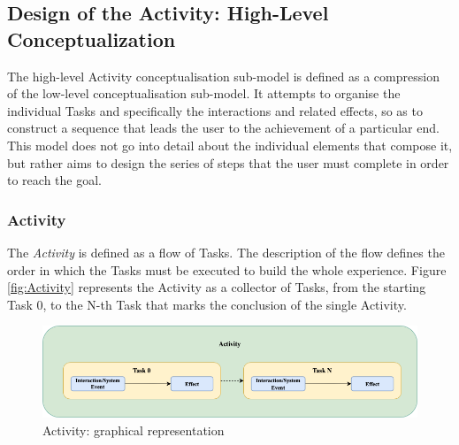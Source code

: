 \subsection*{Design of the Activity: High-Level Conceptualization}
The high-level Activity conceptualisation sub-model is defined as a compression of the low-level conceptualisation sub-model. It attempts to organise the individual Tasks and specifically the interactions and related effects, so as to construct a sequence that leads the user to the achievement of a particular end. This model does not go into detail about the individual elements that compose it, but rather aims to design the series of steps that the user must complete in order to reach the goal. 

\subsubsection*{Activity}
The \emph{Activity} is defined as a flow of Tasks. The description of the flow defines the order in which the Tasks must be executed to build the whole experience. Figure \autoref{fig:Activity} represents the Activity as a collector of Tasks, from the starting Task 0, to the N-th Task that marks the conclusion of the single Activity. 
\begin{figure}[h]
	\centering
	\includegraphics[width=13cm]{Figures/Conceptual Model/Activity.png}
	\caption{Activity: graphical representation}
	\label{fig:Activity}
\end{figure}

